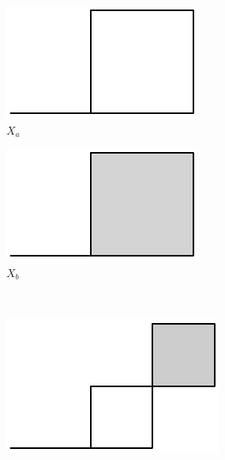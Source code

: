\begin{figure}[h]
	\centering
	\begin{subfigure}[b]{0.2\textwidth}
		\includegraphics[width=\textwidth]{Figs/homology2d-a.pdf}
		\caption{$X_a$} \label{fig:homology2d-a}
	\end{subfigure} \qquad
	\begin{subfigure}[b]{0.2\textwidth}
		\includegraphics[width=\textwidth]{Figs/homology2d-b.pdf}
		\caption{$X_b$} \label{fig:homology2d-b}
	\end{subfigure} \\
	\begin{subfigure}[b]{0.2\textwidth}
		\includegraphics[width=\textwidth]{Figs/homology2d-c.pdf}

\end{subfigure}
\end{figure}
